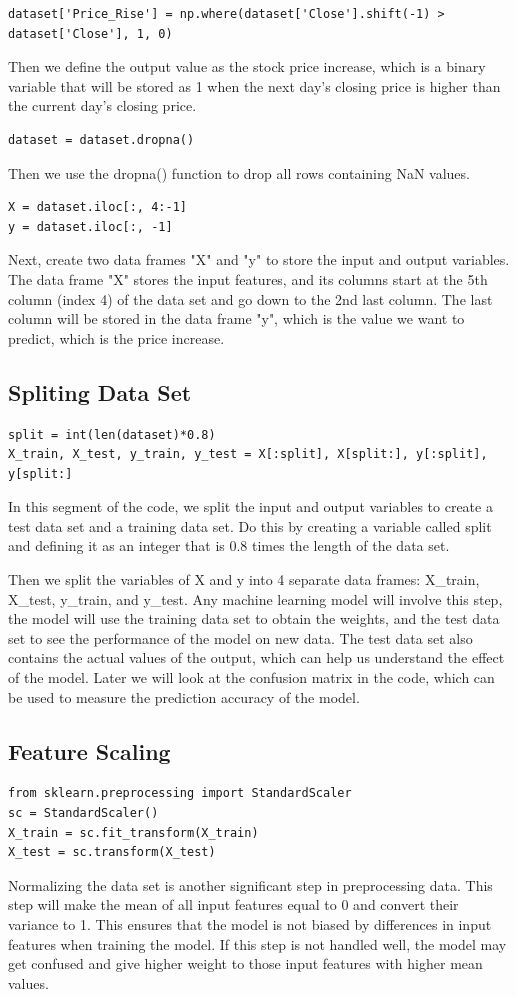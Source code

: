 \documentclass{article}
\begin{document}
\begin{verbatim}
dataset['Price_Rise'] = np.where(dataset['Close'].shift(-1) > dataset['Close'], 1, 0)
\end{verbatim}
Then we define the output value as the stock price increase, which is a binary variable that will be stored as 1 when the next day's closing price is higher than the current day's closing price.
\begin{verbatim}
dataset = dataset.dropna()
\end{verbatim}
Then we use the dropna() function to drop all rows containing NaN values.
\begin{verbatim}
X = dataset.iloc[:, 4:-1]
y = dataset.iloc[:, -1]
\end{verbatim}
Next, create two data frames "X" and "y" to store the input and output variables. The data frame "X" stores the input features, and its columns start at the 5th column (index 4) of the data set and go down to the 2nd last column. The last column will be stored in the data frame "y", which is the value we want to predict, which is the price increase.

\subsection{Spliting Data Set}
\begin{verbatim}
split = int(len(dataset)*0.8)
X_train, X_test, y_train, y_test = X[:split], X[split:], y[:split], y[split:]
\end{verbatim}
In this segment of the code, we split the input and output variables to create a test data set and a training data set. Do this by creating a variable called split and defining it as an integer that is 0.8 times the length of the data set.

Then we split the variables of X and y into 4 separate data frames: X\_train, X\_test, y\_train, and y\_test. Any machine learning model will involve this step, the model will use the training data set to obtain the weights, and the test data set to see the performance of the model on new data. The test data set also contains the actual values of the output, which can help us understand the effect of the model. Later we will look at the confusion matrix in the code, which can be used to measure the prediction accuracy of the model.

\subsection{Feature Scaling}
\begin{verbatim}
from sklearn.preprocessing import StandardScaler
sc = StandardScaler()
X_train = sc.fit_transform(X_train)
X_test = sc.transform(X_test)
\end{verbatim}
Normalizing the data set is another significant step in preprocessing data. 
This step will make the mean of all input features equal to 0 and convert their variance to 1. This ensures that the model is not biased by differences in input features when training the model. If this step is not handled well, the model may get confused and give higher weight to those input features with higher mean values.
\end{document}
